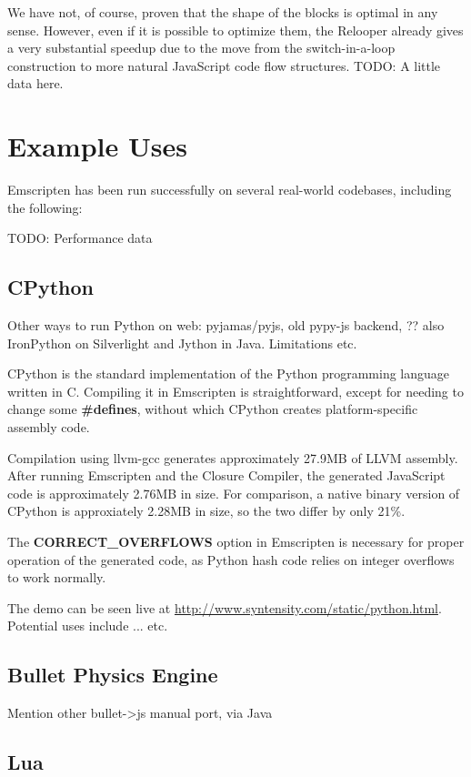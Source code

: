 \documentclass[11pt]{proc}
\begin{document}
We have not, of course, proven that the shape of the blocks is optimal
in any sense. However, even if it is possible to optimize them, the Relooper
already gives a very substantial speedup due to the move from the switch-in-a-loop
construction to more natural JavaScript code flow structures. TODO: A little data here.



\section{Example Uses}

Emscripten has been run successfully on several real-world codebases, including
the following:

TODO: Performance data

\subsection{CPython}

Other ways to run Python on web: pyjamas/pyjs, old pypy-js backend, ?? also
IronPython on Silverlight and Jython in Java. Limitations etc.

CPython is the standard implementation of the Python programming language written
in C. Compiling it in Emscripten is straightforward, except for needing to
change some \textbf{\#defines}, without which CPython creates platform-specific assembly code.

Compilation using llvm-gcc generates approximately 27.9MB of LLVM assembly. After
running Emscripten and the Closure Compiler, the generated JavaScript code is
approximately 2.76MB in size. For comparison, a native binary version of
CPython is approxiately 2.28MB in size, so the two differ by only 21\%.

The \textbf{CORRECT\_OVERFLOWS} option in Emscripten is necessary for proper
operation of the generated code, as Python hash code relies on integer overflows
to work normally.

The demo can be seen live at \url{http://www.syntensity.com/static/python.html}.
Potential uses include ... etc.

\subsection{Bullet Physics Engine}

Mention other bullet->js manual port, via Java

\subsection{Lua}
\end{document}

